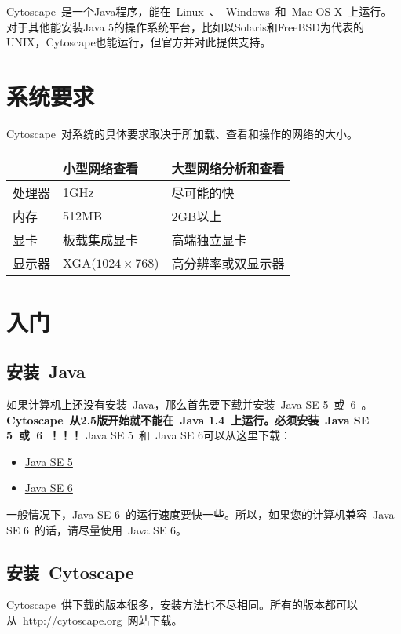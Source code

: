 Cytoscape~是一个Java程序，能在~Linux~、~Windows~和~Mac OS X~上运行。对于其他能安装Java 5的操作系统平台，比如以Solaris和FreeBSD为代表的UNIX，Cytoscape也能运行，但官方并对此提供支持。

\section{系统要求}
	Cytoscape~对系统的具体要求取决于所加载、查看和操作的网络的大小。

	\begin{table}[htbp]
	\label{tabel:2}
	\centering
	\begin{tabular}{|l|l|l|}
	\hline
	 & 小型网络查看 & 大型网络分析和查看 \\
	\hline
	处理器 & 1GHz & 尽可能的快\\
	\hline
	内存   & 512MB & 2GB以上 \\
	\hline
	显卡   & 板载集成显卡 & 高端独立显卡 \\
	\hline
	显示器 & XGA($1024 \times 768$) & 高分辨率或双显示器 \\
	\hline
	\end{tabular}
	\end{table}

\section{入门}
	\subsection{安装~Java}
		如果计算机上还没有安装~Java，那么首先要下载并安装~Java SE 5~或~6~。\textbf{Cytoscape~从2.5版开始就不能在~Java 1.4~上运行。必须安装~Java SE 5~或~6~！！！}
		Java SE 5~和~Java SE 6可以从这里下载：
		\begin{itemize}
		\item \href{http://java.sun.com/javase/downloads/index_jdk5.jsp}{Java SE 5}
		\item \href{http://java.sun.com/javase/downloads/index.jsp}{Java SE 6}
		\end{itemize}
	
		一般情况下，Java SE 6~的运行速度要快一些。所以，如果您的计算机兼容~Java SE 6~的话，请尽量使用~Java SE 6。

	\subsection{安装~Cytoscape}
		Cytoscape~供下载的版本很多，安装方法也不尽相同。所有的版本都可以从~http://cytoscape.org~网站下载。
		
